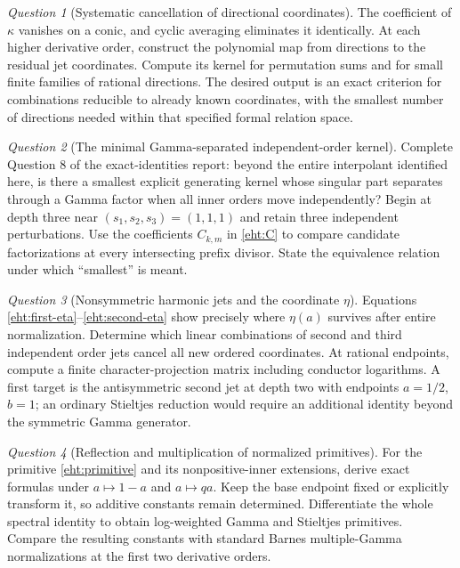 \documentclass[11pt]{article}
\numberwithin{equation}{section}
\theoremstyle{plain}
\theoremstyle{definition}
\theoremstyle{remark}
\newtheorem{question}{Question}
\begin{document}
\begin{question}[Systematic cancellation of directional coordinates]
The coefficient of $\kappa$ vanishes on a conic, and cyclic averaging
eliminates it identically. At each higher derivative order, construct
the polynomial map from directions to the residual jet coordinates.
Compute its kernel for permutation sums and for small finite families
of rational directions. The desired output is an exact criterion
for combinations reducible to already known coordinates, with the
smallest number of directions needed within that specified formal
relation space.
\end{question}

\begin{question}[The minimal Gamma-separated independent-order kernel]
Complete Question 8 of the exact-identities report: beyond the entire
interpolant identified here, is there a smallest explicit generating
kernel whose singular part separates through a Gamma factor when
all inner orders move independently? Begin at depth three near
$(s_1,s_2,s_3)=(1,1,1)$ and retain three independent perturbations.
Use the coefficients $C_{k,m}$ in \eqref{eht:C} to compare candidate
factorizations at every intersecting prefix divisor. State the
equivalence relation under which ``smallest'' is meant.
\end{question}

\begin{question}[Nonsymmetric harmonic jets and the coordinate $\eta$]
Equations \eqref{eht:first-eta}--\eqref{eht:second-eta} show precisely
where $\eta(a)$ survives after entire normalization. Determine which
linear combinations of second and third independent order jets cancel
all new ordered coordinates. At rational endpoints, compute a finite
character-projection matrix including conductor logarithms. A first
target is the antisymmetric second jet at depth two with endpoints
$a=1/2$, $b=1$; an ordinary Stieltjes reduction would require an
additional identity beyond the symmetric Gamma generator.
\end{question}

\begin{question}[Reflection and multiplication of normalized primitives]
For the primitive \eqref{eht:primitive} and its nonpositive-inner
extensions, derive exact formulas under $a\mapsto1-a$ and
$a\mapsto qa$. Keep the base endpoint fixed or explicitly transform
it, so additive constants remain determined. Differentiate the whole
spectral identity to obtain log-weighted Gamma and Stieltjes
primitives. Compare the resulting constants with standard Barnes
multiple-Gamma normalizations at the first two derivative orders.
\end{question}
\end{document}

